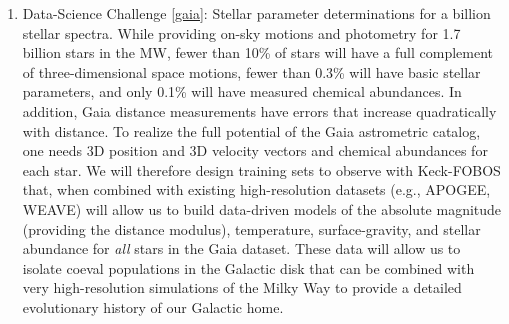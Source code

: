 \documentclass[oneside,11pt]{amsart}
\newcounter{chalno}
\newcommand{\chal}[1]{\refstepcounter{chalno}\label{#1}}
\begin{document}
\begin{enumerate}[rightmargin=0.2cm,leftmargin=0.2cm]
\chal{gaia} 
%
\item[] {\textsf {\large Data-Science Challenge \ref{gaia}: Stellar
parameter determinations for a billion stellar spectra.}} While
providing on-sky motions and photometry for 1.7 billion stars in the MW,
fewer than 10\% of stars will have a full complement of
three-dimensional space motions, fewer than 0.3\% will have basic
stellar parameters, and only 0.1\% will have measured chemical
abundances.  In addition, Gaia distance measurements have errors that
increase quadratically with distance.  To realize the full potential of
the Gaia astrometric catalog, one needs 3D position and 3D velocity
vectors and chemical abundances for each star.  We will therefore design
training sets to observe with Keck-FOBOS that, when combined with
existing high-resolution datasets (e.g., APOGEE, WEAVE) will allow us to
build data-driven models of the absolute magnitude (providing the
distance modulus), temperature, surface-gravity, and stellar abundance
for {\it all} stars in the Gaia dataset.  These data will allow us to
isolate coeval populations in the Galactic disk that can be combined
with very high-resolution simulations of the Milky Way to provide a
detailed evolutionary history of our Galactic home.

\end{enumerate}





\end{document}
